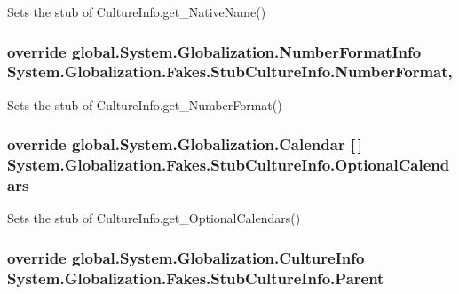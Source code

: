 Sets the stub of Culture\-Info.\-get\-\_\-\-Native\-Name()

\hypertarget{class_system_1_1_globalization_1_1_fakes_1_1_stub_culture_info_a0a75c5714e81adad558c8c79e43da5ac}{
\subsubsection[{Number\-Format}]{\setlength{\rightskip}{0pt plus 5cm}override global.\-System.\-Globalization.\-Number\-Format\-Info System.\-Globalization.\-Fakes.\-Stub\-Culture\-Info.\-Number\-Format\hspace{0.3cm}{\ttfamily [get]}, {\ttfamily [set]}}}\label{class_system_1_1_globalization_1_1_fakes_1_1_stub_culture_info_a0a75c5714e81adad558c8c79e43da5ac}


Sets the stub of Culture\-Info.\-get\-\_\-\-Number\-Format()

\hypertarget{class_system_1_1_globalization_1_1_fakes_1_1_stub_culture_info_a19f771049e261edc46e41592723b0676}{
\subsubsection[{Optional\-Calendars}]{\setlength{\rightskip}{0pt plus 5cm}override global.\-System.\-Globalization.\-Calendar \mbox{[}$\,$\mbox{]} System.\-Globalization.\-Fakes.\-Stub\-Culture\-Info.\-Optional\-Calendars\hspace{0.3cm}{\ttfamily [get]}}}\label{class_system_1_1_globalization_1_1_fakes_1_1_stub_culture_info_a19f771049e261edc46e41592723b0676}


Sets the stub of Culture\-Info.\-get\-\_\-\-Optional\-Calendars()

\hypertarget{class_system_1_1_globalization_1_1_fakes_1_1_stub_culture_info_a10abdb788a096a54c4ce2b0fcd9c678e}{
\subsubsection[{Parent}]{\setlength{\rightskip}{0pt plus 5cm}override global.\-System.\-Globalization.\-Culture\-Info System.\-Globalization.\-Fakes.\-Stub\-Culture\-Info.\-Parent\hspace{0.3cm}{\ttfamily [get]}}}\label{class_system_1_1_globalization_1_1_fakes_1_1_stub_culture_info_a10abdb788a096a54c4ce2b0fcd9c678e}


